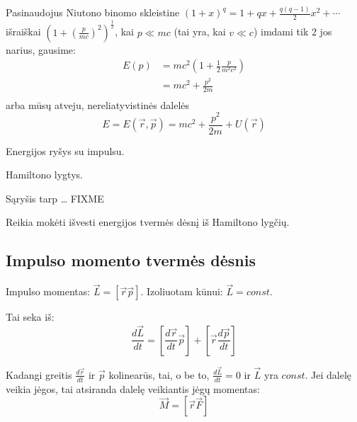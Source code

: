 Pasinaudojus Niutono binomo skleistine
$(1+x)^{q} = 1 + qx + \frac{q(q-1)}{2}x^{2}+\cdots$ išraiškai
$\left( 1 + \left( \frac{p}{mc} \right)^{2} \right)^{\frac{1}{2}}$, kai
$p \ll mc$ (tai yra, kai $v \ll c$) imdami tik 2 jos narius,
gausime:
\begin{align*}
  E(p)
  &= mc^{2}\left( 1 + \frac{1}{2}\frac{p}{m^{2}c^{2}} \right) \\
  &= mc^{2} + \frac{p^{2}}{2m} \\
\end{align*}
arba mūsų atveju, nereliatyvistinės dalelės
\begin{equation*}
  E
  = E(\vec{r}, \vec{p})
  = mc^{2} + \frac{p^{2}}{2m} + U(\vec{r})
\end{equation*}

\begin{remember}
  \item Energijos ryšys su impulsu.
  \item Hamiltono lygtys.
  \item Sąryšis tarp … FIXME
  \item Reikia mokėti išvesti energijos tvermės dėsnį iš Hamiltono
    lygčių.
\end{remember}

\subsection{Impulso momento tvermės dėsnis}

Impulso momentas: $\vec{L} = \left[ \vec{r}\vec{p} \right]$.
Izoliuotam kūnui: $\vec{L} = const.$

Tai seka iš:
\begin{equation*}
  \frac{d\vec{L}}{dt} = \left[ \frac{d\vec{r}}{dt} \vec{p} \right] +
  \left[ \vec{r} \frac{d\vec{p}}{dt} \right]
\end{equation*}

Kadangi greitis $\frac{d\vec{r}}{dt}$ ir $\vec{p}$ kolinearūs, tai,
o be to, $\frac{d\vec{L}}{dt} = 0$ ir $\vec{L}$ yra $const$.
Jei dalelę veikia jėgos, tai atsiranda dalelę veikiantis jėgų
momentas:
\begin{equation*}
  \vec{M} = \left[ \vec{r}\vec{F} \right]
\end{equation*}

